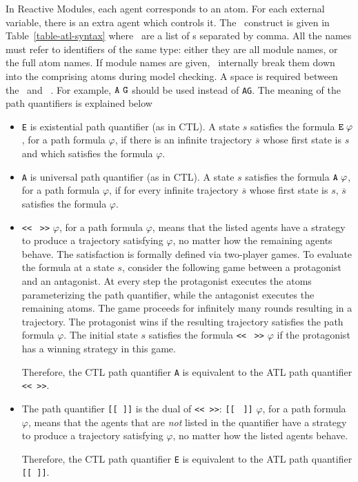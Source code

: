 In Reactive Modules, each agent corresponds to an atom.
For each external variable, there is an extra agent which controls it.
The \pathQuantifier\ construct is given in Table~\ref{table-atl-syntax}
where \names\ are a list of \fullident{}s separated by comma. All the
names must refer to identifiers of the same type: either they
are all module names, or the full atom names.  If module names are
given, \mocha\ internally break them down into the comprising atoms
during model checking.
A space is required 
between the \pathQuantifier\ and \pathFormula\ . For example, 
${\tt A}\ {\tt G}$ should be used instead of {\tt AG}.
The meaning of the path quantifiers is explained below
\begin{itemize}
\item
{\tt E} is existential path quantifier (as in CTL).
A state $s$ satisfies the formula ${\tt E}\;\varphi$,
for a path formula $\varphi$, if there is an infinite trajectory
$\overline{s}$ whose first state is $s$ and which satisfies the formula
$\varphi$.
\item
{\tt A} is universal path quantifier (as in CTL).
A state $s$ satisfies the formula ${\tt A}\;\varphi$,
for a path formula $\varphi$, if for every infinite trajectory
$\overline{s}$ whose first state is $s$, $\overline{s}$ satisfies the formula
$\varphi$.
\item
{\tt <<} \names\ {\tt >>} $\varphi$, for a path formula $\varphi$, means
that the listed agents have a strategy to produce a trajectory satisfying
$\varphi$, no matter how the remaining agents behave.
The satisfaction is formally defined via two-player games.
To evaluate the formula at a state $s$, consider 
the following game between a protagonist and an antagonist.
At every step the protagonist executes the atoms parameterizing the
path quantifier, while the antagonist executes the remaining atoms.
The game proceeds for infinitely many rounds resulting in a trajectory.
The protagonist wins if the resulting trajectory satisfies the path
formula $\varphi$. The initial state $s$ satisfies the formula
{\tt <<} \names\ {\tt >>} $\varphi$ if the protagonist has a winning 
strategy in this game. 

Therefore, the CTL path quantifier {\tt A} is
equivalent to the ATL path quantifier {\tt << >>}. 
\item
The path quantifier {\tt [[ ]]} is the dual of {\tt << >>}:
{\tt [[} \names\ {\tt ]]} $\varphi$, for a path formula $\varphi$, means
that the agents that are {\em not} listed in the quantifier
have a  strategy to produce a trajectory satisfying
$\varphi$, no matter how the listed agents behave.

Therefore, the CTL path quantifier {\tt E} is equivalent to the ATL
path quantifier {\tt [[ ]]}. 
\end{itemize}

